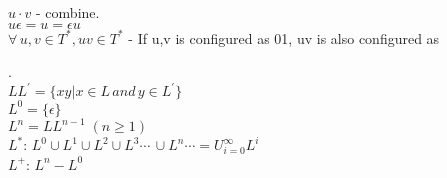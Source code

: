 \documentclass{article}
\begin{document}
\large $u \cdot v$ \normalsize - combine.
\\

\large $u\epsilon = u = \epsilon u $
\\

\large $\forall\, u,v\in T^*, uv \in T^*$ \normalsize - If u,v is configured as 01, uv is also configured as 

\qquad \qquad \qquad \qquad \qquad \;.
\\

\large ${LL^'}=\{{xy} | x\in L \,and\, y \in {L^'}\}$
\\

\large ${L^0}=\{\epsilon\}$
\\

\large ${L^n}=L{L^{n-1}} \;(n \geq 1)$
\\

\large $L^*$: ${L^0} \cup {L^1} \cup {L^2} \cup {L^3} \cdots \, \cup {L^n} \cdots = U_{i=0}^\infty{L^i} $
\\

\large ${L^+}$: ${L^n} - {L^0}$
\end{document}
